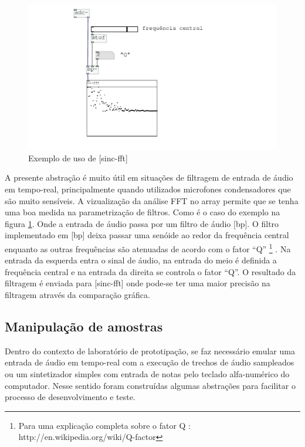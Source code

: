 \documentclass{ppgmus}
\begin{document}
\begin{figure}
\includegraphics[scale=.55]{sinc-fft-help}
\caption{Exemplo de uso de [sinc-fft]}
\label{sinc-fft-help}
\end{figure}


A presente abstração é muito útil em situações de filtragem de entrada de áudio em tempo-real, principalmente
quando utilizados microfones condensadores que são muito sensíveis.
A vizualização da análise FFT no array permite que se tenha uma boa medida na parametrização de filtros.
Como é o caso do exemplo na figura \ref{sinc-fft-help}. Onde a entrada de áudio passa por um filtro
de áudio [bp\texttildelow]. O filtro implementado em [bp\texttildelow] deixa passar uma senóide ao
redor da frequência central enquanto as outras frequências são atenuadas de acordo com o fator ``Q''
\footnote{Para uma explicação completa sobre o fator Q : http://en.wikipedia.org/wiki/Q-factor} .
Na entrada da esquerda entra o sinal de áudio, na entrada do meio é definida a frequência central e na
entrada da direita se controla o fator ``Q''. O resultado da filtragem é enviada para [sinc-fft] onde 
pode-se ter uma maior precisão na filtragem através da comparação gráfica.

 

\subsection{Manipulação de amostras}


  Dentro do  contexto de laboratório de prototipação, se faz necessário emular uma entrada 
de áudio em tempo-real com a execução de trechos de áudio sampleados ou um sintetizador simples
com entrada de notas pelo teclado alfa-numérico do computador. Nesse sentido foram construídas
algumas abstrações para facilitar o processo de desenvolvimento e teste.
\end{document}
